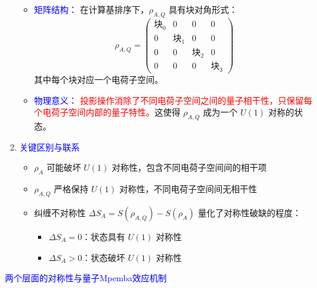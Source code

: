 \documentclass[11pt,a4paper]{article}
\begin{document}
\begin{enumerate}
\begin{itemize}
        \item \textcolor{blue}{矩阵结构：} 在计算基排序下，$\rho_{A,Q}$ 具有块对角形式：
        \begin{equation}
        \rho_{A,Q} = \begin{pmatrix}
        \text{块}_0 & 0 & 0 & 0 \\
        0 & \text{块}_1 & 0 & 0 \\
        0 & 0 & \text{块}_2 & 0 \\
        0 & 0 & 0 & \text{块}_3
        \end{pmatrix}
        \end{equation}
        其中每个块对应一个电荷子空间。
        
        \item \textcolor{blue}{物理意义：} \textcolor{red}{投影操作消除了不同电荷子空间之间的量子相干性，只保留每个电荷子空间内部的量子特性。}这使得 $\rho_{A,Q}$ 成为一个 $U(1)$ 对称的状态。
    \end{itemize}
    
    \item \textcolor{blue}{关键区别与联系}
    \begin{itemize}
        \item $\rho_A$ 可能破坏 $U(1)$ 对称性，包含不同电荷子空间间的相干项
        \item $\rho_{A,Q}$ 严格保持 $U(1)$ 对称性，不同电荷子空间间无相干性
        \item 纠缠不对称性 $\Delta S_A = S(\rho_{A,Q}) - S(\rho_A)$ 量化了对称性破缺的程度：
        \begin{itemize}
            \item $\Delta S_A = 0$：状态具有 $U(1)$ 对称性
            \item $\Delta S_A > 0$：状态破坏 $U(1)$ 对称性
        \end{itemize}
    \end{itemize}
\end{enumerate}
\textcolor{blue}{两个层面的对称性与量子Mpemba效应机制}
\end{document}
